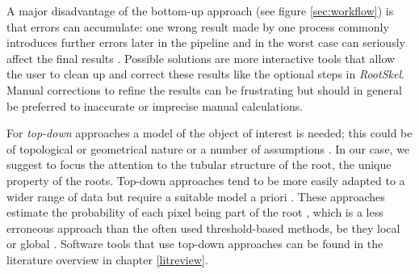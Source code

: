 A major disadvantage of the bottom-up approach (see figure \ref{sec:workflow}) is that errors can accumulate: one wrong result made by one process commonly introduces further errors later in the pipeline and in the worst case can seriously affect the final results \cite{pound2013rootnav}.
Possible solutions are more interactive tools that allow the user to clean up and correct these results \cite{armengaud2009ez,clark20113} like the optional steps in \textit{RootSkel}. Manual corrections to refine the results can be frustrating but should in general be preferred to inaccurate or imprecise manual calculations.

For \textit{top-down} approaches a model of the object of interest is needed; this could be of topological or geometrical nature \cite{pound2012cellset,taub1996root} or a number of assumptions \cite{mooney2012developing}. In our case, we suggest to focus the attention to the tubular structure of the root, the unique property of the roots. Top-down approaches tend to be more easily adapted to a wider range of data but require a suitable model a priori  \cite{pound2013rootnav}.
These approaches estimate the probability of each pixel being part of the root \cite{pound2013rootnav}, which is a less erroneous approach than the often used threshold-based methods, be they local or global \cite{pound2013rootnav}. Software tools that use top-down approaches can be found in the literature overview in chapter \ref{litreview}.



